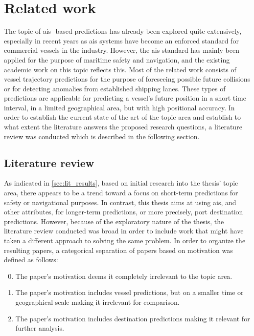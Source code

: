 \chapter{Related work}
\label{chap:related_work}

The topic of \acrfull{ais} -based predictions has already been explored quite extensively, especially in recent years as \acrshort{ais} systems have become an enforced standard for commercial vessels in the industry. However, the \acrshort{ais} standard has mainly been applied for the purpose of maritime safety and navigation, and the existing academic work on this topic reflects this. Most of the related work consists of vessel trajectory predictions for the purpose of foreseeing possible future collisions or for detecting anomalies from established shipping lanes. These types of predictions are applicable for predicting a vessel's future position in a short time interval, in a limited geographical area, but with high positional accuracy. In order to establish the current state of the art of the topic area and establish to what extent the literature answers the proposed research questions, a literature review was conducted which is described in the following section.

\section{Literature review}
\label{sec:lit_review}

As indicated in \cref{sec:lit_results}, based on initial research into the thesis' topic area, there appears to be a trend toward a focus on short-term predictions for safety or navigational purposes. In contrast, this thesis aims at using \acrshort{ais}, and other attributes, for longer-term predictions, or more precisely, port destination predictions. However, because of the exploratory nature of the thesis, the literature review conducted was broad in order to include work that might have taken a different approach to solving the same problem. In order to organize the resulting papers, a categorical separation of papers based on motivation was defined as follows:

\begin{enumerate}
\setcounter{enumi}{-1}
    \item The paper's motivation deems it completely irrelevant to the topic area.
    \item The paper's motivation includes vessel predictions, but on a smaller time or geographical scale making it irrelevant for comparison.
    \item The paper's motivation includes destination predictions making it relevant for further analysis.
\end{enumerate}


